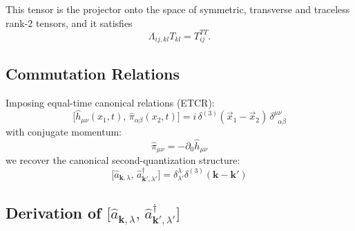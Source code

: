 \documentclass[12pt,a4paper]{article}
\begin{document}
This tensor is the projector onto the space of symmetric, transverse and traceless rank-2 tensors, and it satisfies
\[
\Lambda_{ij,kl} T_{kl} = T^{TT}_{ij}.
\]
\subsection*{Commutation Relations}

Imposing equal-time canonical relations (ETCR):
\begin{equation}
    \bigl[\hat{h}_{\mu\nu}(x_1,t),\, \hat{\pi}_{\alpha\beta}(x_2,t)\bigr]
    = i\,\delta^{(3)}(\vec{x}_1 - \vec{x}_2)\, \delta^{\mu\nu}_{\;\;\alpha\beta}
\end{equation}
with conjugate momentum:
\begin{equation}
    \hat{\pi}_{\mu\nu} = -\partial_0 \hat{h}_{\mu\nu}
\end{equation}
we recover the canonical second-quantization structure:
\begin{equation}
      \bigl[\hat{a}_{\mathbf{k},\lambda},\, \hat{a}^{\dagger}_{\mathbf{k}',\lambda'}\bigr] = \delta^{\lambda}_{\lambda'} \delta^{(3)}(\mathbf{k}-\mathbf{k}')
\end{equation}

\subsection*{Derivation of $\bigl[\hat{a}_{\mathbf{k},\lambda},\,\hat{a}^{\dagger}_{\mathbf{k}',\lambda'}\bigr]$}
\end{document}
